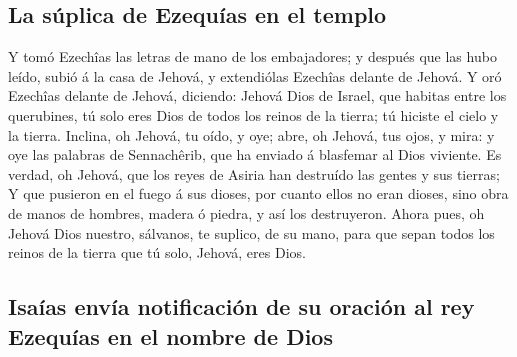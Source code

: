 \hypertarget{la-suxfaplica-de-ezequuxedas-en-el-templo}{%
\subsection{La súplica de Ezequías en el
templo}\label{la-suxfaplica-de-ezequuxedas-en-el-templo}}

 Y tomó Ezechîas las letras de mano de los embajadores; y
después que las hubo leído, subió á la casa de Jehová, y extendiólas
Ezechîas delante de Jehová.  Y oró Ezechîas delante de
Jehová, diciendo: Jehová Dios de Israel, que habitas entre los
querubines, tú solo eres Dios de todos los reinos de la tierra; tú
hiciste el cielo y la tierra.  Inclina, oh Jehová, tu
oído, y oye; abre, oh Jehová, tus ojos, y mira: y oye las palabras de
Sennachêrib, que ha enviado á blasfemar al Dios viviente.
 Es verdad, oh Jehová, que los reyes de Asiria han
destruído las gentes y sus tierras;  Y que pusieron en el
fuego á sus dioses, por cuanto ellos no eran dioses, sino obra de manos
de hombres, madera ó piedra, y así los destruyeron. 
Ahora pues, oh Jehová Dios nuestro, sálvanos, te suplico, de su mano,
para que sepan todos los reinos de la tierra que tú solo, Jehová, eres
Dios.

\hypertarget{isauxedas-envuxeda-notificaciuxf3n-de-su-oraciuxf3n-al-rey-ezequuxedas-en-el-nombre-de-dios}{%
\subsection{Isaías envía notificación de su oración al rey Ezequías en
el nombre de
Dios}\label{isauxedas-envuxeda-notificaciuxf3n-de-su-oraciuxf3n-al-rey-ezequuxedas-en-el-nombre-de-dios}}

